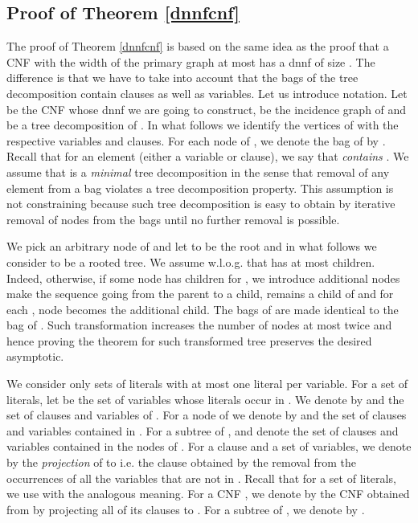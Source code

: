 \documentclass{llncs}
\begin{document}
\subsection{Proof of Theorem \ref{dnnfcnf}} \label{dnnfcnfproof}

The proof of Theorem \ref{dnnfcnf} is based on the same idea as the proof that a CNF with the width of the primary graph
at most  has a {\sc dnnf} of size  \cite{DarwicheJACM}. The difference is that we have to take into account that
the bags of the tree decomposition contain clauses as well as variables. Let us introduce notation. Let  be the CNF whose
{\sc dnnf} we are going to construct,
 be the incidence graph of  and  be a tree decomposition of . In what follows we identify the vertices
of  with the respective variables and clauses. For each node  of , we denote the bag of  by . 
Recall that for an element  (either a variable or clause), we say 
that  \emph{contains} . 
We assume that  is a \emph{minimal} tree decomposition in the sense that removal of
any element from a bag violates a tree decomposition property. This assumption is not constraining
because such tree decomposition is easy to obtain by iterative removal of nodes from the bags until no
further removal is possible.  


We pick an arbitrary node  of  and let to be the root and in what follows
we consider  to be a rooted tree. We assume w.l.o.g. that  has at most  children. 
Indeed, otherwise, if some node  has
children  for , we introduce additional nodes  make the sequence  going from the parent to a child,  remains a child of  and for each , node  becomes the additional child.
The bags of  are made identical to the bag of . Such transformation increases the number of nodes at most twice and hence proving the theorem for such transformed tree preserves the desired asymptotic. 

We consider only sets of literals with at most one literal per variable. For a set  of literals, let 
be the set of variables whose literals occur in .
We denote by  and  the set of clauses and variables of . For a node  of  we denote by 
and  the set of clauses and variables contained in . For a subtree  of ,  and  denote
the set of clauses and variables contained in the nodes of . For a clause  and a set  of variables, we denote
by  the \emph{projection} of  to  i.e. the clause obtained by the removal from  the occurrences
of all the variables that are not in . Recall that for a set  of literals, we use  with the analogous meaning. 
For a CNF , we denote by  the CNF obtained from  by
projecting all of its clauses to . 
For a subtree  of , we denote  by .
\end{document}
